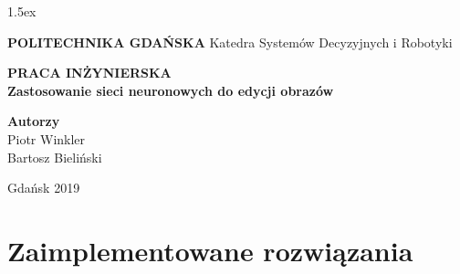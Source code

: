 \documentclass[10pt, a4paper, twoside]{article}
\begin{document}
\parskip 1.5ex %

\baselineskip=15pt  %
\linespread{1.3} %



\begin{titlepage}
  \begin{center}

    \vspace*{1cm}
    \Huge
    \textbf{POLITECHNIKA GDAŃSKA}
    \newline
    \vspace{0.5cm}
    \LARGE
    \newline
    Katedra Systemów Decyzyjnych i Robotyki

    \vspace{1.5cm}
    \textbf{PRACA INŻYNIERSKA}
    \\[0.5cm]
    \textbf{Zastosowanie sieci neuronowych do edycji obrazów}

    \vspace{2.5cm}
    \Large
    \textbf{Autorzy}\\
    Piotr Winkler\\
    Bartosz Bieliński

    \vspace{3.5cm}
    Gdańsk 2019

  \end{center}
\end{titlepage}

\setcounter{page}{2}




\newpage
  \tableofcontents









\section{Zaimplementowane rozwiązania}
\end{document}
